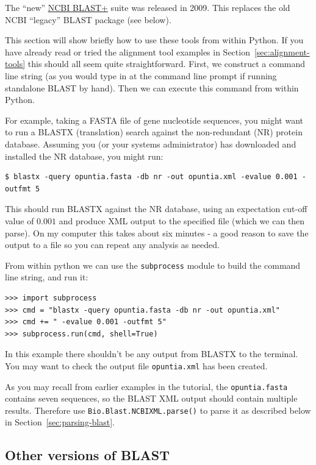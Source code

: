 The ``new''
\href{https://blast.ncbi.nlm.nih.gov/Blast.cgi?CMD=Web&PAGE_TYPE=BlastDocs&DOC_TYPE=Download}
{NCBI BLAST+} suite was released in 2009. This replaces the old NCBI ``legacy'' BLAST
package (see below).

This section will show briefly how to use these tools from within Python. If you have
already read or tried the alignment tool examples in Section~\ref{sec:alignment-tools}
this should all seem quite straightforward. First, we construct a command line string
(as you would type in at the command line prompt if running standalone BLAST by hand).
Then we can execute this command from within Python.

For example, taking a FASTA file of gene nucleotide sequences, you might want to
run a BLASTX (translation) search against the non-redundant (NR) protein database.
Assuming you (or your systems administrator) has downloaded and installed the NR
database, you might run:

\begin{verbatim}
$ blastx -query opuntia.fasta -db nr -out opuntia.xml -evalue 0.001 -outfmt 5
\end{verbatim}

This should run BLASTX against the NR database, using an expectation cut-off value
of $0.001$ and produce XML output to the specified file (which we can then parse).
On my computer this takes about six minutes - a good reason to save the output
to a file so you can repeat any analysis as needed.

From within python we can use the \verb|subprocess| module to build the command line
string, and run it:

\begin{verbatim}
>>> import subprocess
>>> cmd = "blastx -query opuntia.fasta -db nr -out opuntia.xml"
>>> cmd += " -evalue 0.001 -outfmt 5"
>>> subprocess.run(cmd, shell=True)
\end{verbatim}

In this example there shouldn't be any output from BLASTX to the terminal. You may want
to check the output file \verb|opuntia.xml| has been created.

As you may recall from earlier examples in the tutorial, the \verb|opuntia.fasta|
contains seven sequences, so the BLAST XML output should contain multiple results.
Therefore use \verb|Bio.Blast.NCBIXML.parse()| to parse it as described below in
Section~\ref{sec:parsing-blast}.

\subsection{Other versions of BLAST}

